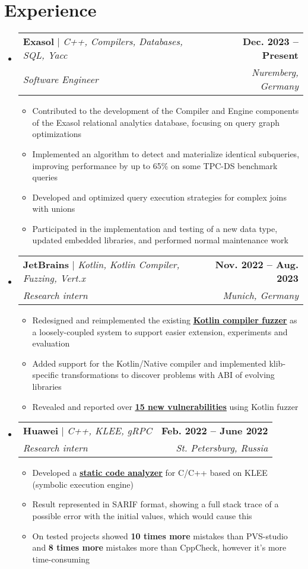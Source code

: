 \documentclass[letterpaper,11pt]{article}
\makeatletter
\newcommand{\resumeItem}[1]{
  \item\large{
    {#1 \vspace{-2pt}}
  }
}
\newcommand{\resumeSubheading}[4]{
  \vspace{-2pt}\item
    \begin{tabular*}{1.0\textwidth}[t]{l@{\extracolsep{\fill}}r}
      #1 & \textbf{\large #2} \\
      \textit{\large#3} & \textit{\large #4} \\
    \end{tabular*}\vspace{-7pt}
}
\newcommand{\resumeSubHeadingListStart}{\begin{itemize}[leftmargin=0.0in, label={}]}
\newcommand{\resumeSubHeadingListEnd}{\end{itemize}}
\newcommand{\resumeItemListStart}{\begin{itemize}}
\newcommand{\resumeItemListEnd}{\end{itemize}\vspace{-5pt}}
\makeatother
\begin{document}


\section{Experience}
  \resumeSubHeadingListStart
    \resumeSubheading
      {\textbf{Exasol} 
      $|$ \emph{C++, Compilers, Databases, SQL, Yacc}
      }{Dec. 2023 -- Present}
      {Software Engineer}{Nuremberg, Germany}
      \resumeItemListStart
        \resumeItem{Contributed to the development of the Compiler and Engine components of the Exasol relational analytics database, focusing on query graph optimizations }
        \resumeItem{Implemented an algorithm to detect and materialize identical subqueries, improving performance by up to 65\% on some TPC-DS benchmark queries}
        \resumeItem{Developed and optimized query execution strategies for complex joins with unions}
        \resumeItem{Participated in the implementation and testing of a new data type, updated embedded libraries, and performed normal maintenance work  }      
        
        
        \resumeItemListEnd

    
    \resumeSubheading
      {\textbf{JetBrains} 
      $|$ \emph{Kotlin, Kotlin Compiler, Fuzzing, Vert.x}
      }{Nov. 2022 -- Aug. 2023}
      {Research intern}{Munich, Germany}
      \resumeItemListStart
        \resumeItem{Redesigned and reimplemented the existing \href{https://github.com/olezhabobrov/fuzzer/tree/klibFuzzing-oleg-bobrov}{\underline{\textbf{Kotlin compiler fuzzer}}} as a loosely-coupled
system to support easier extension, experiments and evaluation}
        \resumeItem{Added support for the Kotlin/Native compiler and implemented klib-specific transformations to discover problems with ABI of evolving libraries}
        \resumeItem{
        Revealed and reported over \href{https://youtrack.jetbrains.com/issues?q=tag:\%20found-by-fuzzer\%20reporter:\%20oleg.bobrov\%20}{\underline{\textbf{15 new vulnerabilities}}}  using Kotlin fuzzer
        }
      \resumeItemListEnd
  
    \resumeSubheading
      {\textbf{Huawei} $|$ \emph{C++, KLEE, gRPC}
      }{Feb. 2022 -- June 2022}{Research intern}{St. Petersburg, Russia}
      \resumeItemListStart
        \resumeItem{Developed a \href{https://github.com/UnitTestBot/UTBotCpp}{\underline{\textbf{static code analyzer}}} for C/C++ based on KLEE (symbolic execution engine) }
        \resumeItem{Result represented in SARIF format, showing a full stack trace of a possible error with the initial values, which would cause this}
        \resumeItem{On tested projects showed \textbf{10 times more} mistakes than PVS-studio and \textbf{8 times more} mistakes more than CppCheck, however it's more time-consuming }
      \resumeItemListEnd
  \resumeSubHeadingListEnd
\end{document}
